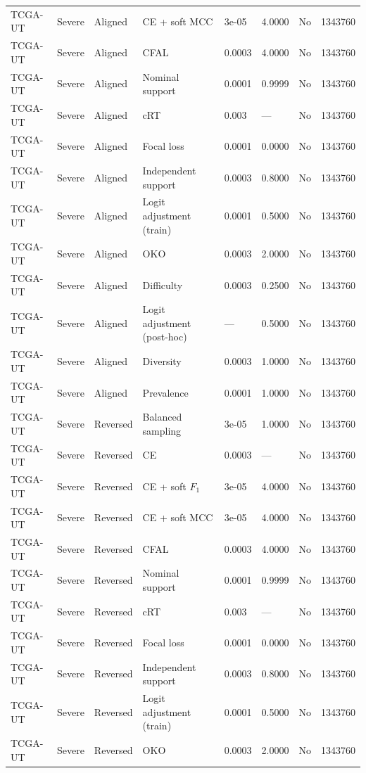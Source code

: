 \begin{longtable}{lllllllr}
TCGA-UT & Severe & Aligned & CE + soft MCC & 3e-05 & 4.0000 & No & 1343760 \\
TCGA-UT & Severe & Aligned & CFAL & 0.0003 & 4.0000 & No & 1343760 \\
TCGA-UT & Severe & Aligned & Nominal support & 0.0001 & 0.9999 & No & 1343760 \\
TCGA-UT & Severe & Aligned & cRT & 0.003 & --- & No & 1343760 \\
TCGA-UT & Severe & Aligned & Focal loss & 0.0001 & 0.0000 & No & 1343760 \\
TCGA-UT & Severe & Aligned & Independent support & 0.0003 & 0.8000 & No & 1343760 \\
TCGA-UT & Severe & Aligned & Logit adjustment (train) & 0.0001 & 0.5000 & No & 1343760 \\
TCGA-UT & Severe & Aligned & OKO & 0.0003 & 2.0000 & No & 1343760 \\
TCGA-UT & Severe & Aligned & Difficulty & 0.0003 & 0.2500 & No & 1343760 \\
TCGA-UT & Severe & Aligned & Logit adjustment (post-hoc) & --- & 0.5000 & No & 1343760 \\
TCGA-UT & Severe & Aligned & Diversity & 0.0003 & 1.0000 & No & 1343760 \\
TCGA-UT & Severe & Aligned & Prevalence & 0.0001 & 1.0000 & No & 1343760 \\
TCGA-UT & Severe & Reversed & Balanced sampling & 3e-05 & 1.0000 & No & 1343760 \\
TCGA-UT & Severe & Reversed & CE & 0.0003 & --- & No & 1343760 \\
TCGA-UT & Severe & Reversed & CE + soft $F_1$ & 3e-05 & 4.0000 & No & 1343760 \\
TCGA-UT & Severe & Reversed & CE + soft MCC & 3e-05 & 4.0000 & No & 1343760 \\
TCGA-UT & Severe & Reversed & CFAL & 0.0003 & 4.0000 & No & 1343760 \\
TCGA-UT & Severe & Reversed & Nominal support & 0.0001 & 0.9999 & No & 1343760 \\
TCGA-UT & Severe & Reversed & cRT & 0.003 & --- & No & 1343760 \\
TCGA-UT & Severe & Reversed & Focal loss & 0.0001 & 0.0000 & No & 1343760 \\
TCGA-UT & Severe & Reversed & Independent support & 0.0003 & 0.8000 & No & 1343760 \\
TCGA-UT & Severe & Reversed & Logit adjustment (train) & 0.0001 & 0.5000 & No & 1343760 \\
TCGA-UT & Severe & Reversed & OKO & 0.0003 & 2.0000 & No & 1343760 \\

\end{longtable}

